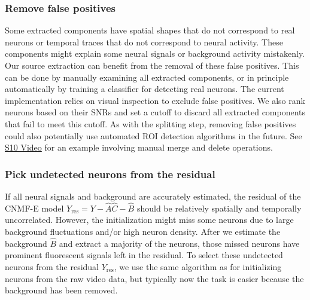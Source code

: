 \documentclass[9pt,lineno]{elife}
\begin{document}
\subsubsection{Remove false positives}
Some extracted components have spatial shapes that do not correspond to real neurons or temporal traces that do not correspond to neural activity. These components might explain some neural signals or background activity mistakenly. Our source extraction can benefit from the removal of these false positives. This can be done by manually examining all extracted components, or in principle automatically by training a classifier for detecting real neurons. The current implementation relies on visual inspection to exclude false positives. We also rank neurons based on their SNRs and set a cutoff to discard all extracted components that fail to meet this cutoff. As with the splitting step, removing false positives could also potentially use automated ROI detection algorithms in the future.  See \href{http://www.columbia.edu/~pz2230/videos/intervention_results.mp4}{S10 Video} for an example involving manual merge and delete operations.

\subsubsection{Pick undetected neurons from the residual}
If all neural signals and background are accurately estimated, the residual of the CNMF-E model $Y_{\text{res}} = Y -\hat{A}\hat{C}-\hat{B}$ should be relatively spatially and temporally uncorrelated. However, the initialization might miss some neurons due to large background fluctuations and/or high neuron density. After we estimate the background $\hat{B}$ and extract a majority of the neurons, those missed neurons have prominent fluorescent signals left in the residual. To select these undetected neurons from the residual $Y_{\text{res}}$, we use the same algorithm as for initializing neurons from the raw video data, but typically now the task is easier because the background has been removed. 
\end{document}
